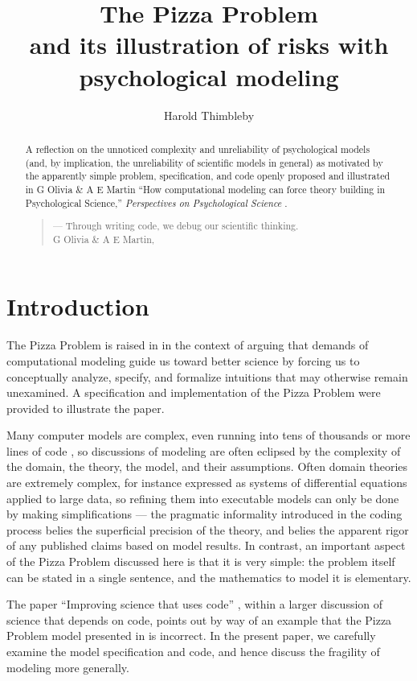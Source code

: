 \documentclass[11pt]{article}
\title{The Pizza Problem \\ and its illustration of risks with psychological modeling}
\author{Harold Thimbleby}
\begin{document}
\maketitle

\begin{abstract}
\noindent
A reflection on the unnoticed complexity and unreliability of psychological models (and, by implication, the unreliability of scientific models in general) as motivated by the apparently simple problem, specification, and code openly proposed and illustrated in G Olivia \& A E Martin ``How computational modeling can force theory building in Psychological Science,'' \emph{Perspectives on Psychological Science} %
\cite{pizzap}.

\begin{quote}\flushright
--- {\sf Through writing code, we debug our scientific thinking.} \\ G Olivia \& A E Martin, \cite{pizzap}
\end{quote}
\end{abstract}

\section{Introduction}
The Pizza Problem is raised in \cite{pizzap} in the context of arguing that demands of computational modeling guide us toward better science by forcing us to conceptually analyze, specify, and formalize intuitions that may otherwise remain unexamined. A specification and implementation of the Pizza Problem were provided to illustrate the paper. 

Many computer models are complex, even running into tens of thousands or more lines of code \cite{harold-cj}, so discussions of modeling are often eclipsed by the complexity of the domain, the theory, the model, and their assumptions. Often domain theories are extremely complex, for instance expressed as systems of differential equations applied to large data, so refining them into executable models can only be done by making simplifications --- the pragmatic informality introduced in the coding process belies the superficial precision of the theory, and belies the apparent rigor of any published claims based on model results. In contrast, an important aspect of the Pizza Problem discussed here is that it is very simple: the problem itself can be stated in a single sentence, and the mathematics to model it is elementary.

The paper ``Improving science that uses code'' \cite{harold-cj}, within a larger discussion of science that depends on code, points out by way of an example that the Pizza Problem model presented in \cite{pizzap} is incorrect. In the present paper, we carefully examine the model specification and code, and hence discuss the fragility of modeling more generally. 
\end{document}
